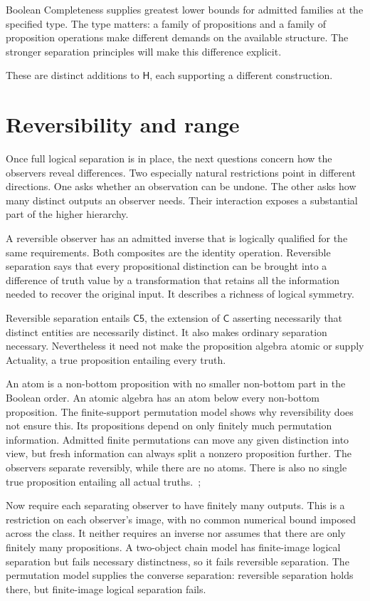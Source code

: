 \documentclass[12pt,letterpaper]{article}
\newcommand{\Hlogic}{\mathsf{H}}
\newcommand{\C}{\mathsf{C}}
\newcommand{\Cfive}{\mathsf{C5}}
\begin{document}
Boolean Completeness supplies greatest lower bounds for admitted families at the specified type. The type matters: a family of propositions and a family of proposition operations make different demands on the available structure. The stronger separation principles will make this difference explicit.


These are distinct additions to $\Hlogic$, each supporting a different construction.


\section{Reversibility and range}

Once full logical separation is in place, the next questions concern how the observers reveal differences. Two especially natural restrictions point in different directions. One asks whether an observation can be undone. The other asks how many distinct outputs an observer needs. Their interaction exposes a substantial part of the higher hierarchy.


A reversible observer has an admitted inverse that is logically qualified for the same requirements. Both composites are the identity operation. Reversible separation says that every propositional distinction can be brought into a difference of truth value by a transformation that retains all the information needed to recover the original input. It describes a richness of logical symmetry.


Reversible separation entails $\Cfive$, the extension of $\C$ asserting necessarily that distinct entities are necessarily distinct. It also makes ordinary separation necessary. Nevertheless it need not make the proposition algebra atomic or supply Actuality, a true proposition entailing every truth.~\cite[\S\S4--7]{r9}


An atom is a non-bottom proposition with no smaller non-bottom part in the Boolean order. An atomic algebra has an atom below every non-bottom proposition. The finite-support permutation model shows why reversibility does not ensure this. Its propositions depend on only finitely much permutation information. Admitted finite permutations can move any given distinction into view, but fresh information can always split a nonzero proposition further. The observers separate reversibly, while there are no atoms. There is also no single true proposition entailing all actual truths.~\cite[\S3]{r14};~\cite[\S7]{r9}


Now require each separating observer to have finitely many outputs. This is a restriction on each observer's image, with no common numerical bound imposed across the class. It neither requires an inverse nor assumes that there are only finitely many propositions. A two-object chain model has finite-image logical separation but fails necessary distinctness, so it fails reversible separation. The permutation model supplies the converse separation: reversible separation holds there, but finite-image logical separation fails.~\cite[\S\S5--7]{r9}
\end{document}
